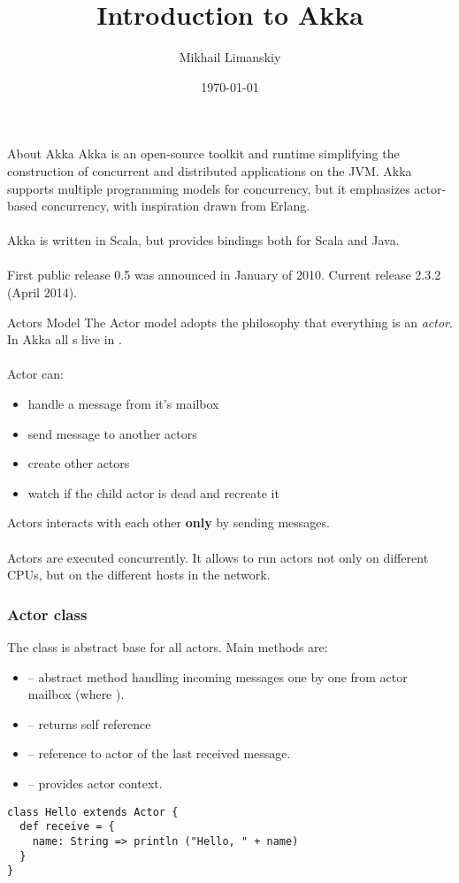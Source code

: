 \documentclass{beamer}
\title{Introduction to Akka}
\author{Mikhail Limanskiy}
\institute{SymphonyTeleca}
\date{\today}
\newcommand\strong\textbf
\begin{document}
\begin{frame}
    \titlepage
\end{frame}

\begin{frame}{About Akka}
Akka is an open-source toolkit and runtime simplifying the construction of concurrent
and distributed applications on the JVM. Akka supports multiple programming models
for concurrency, but it emphasizes actor-based concurrency, with inspiration drawn from Erlang.\\~\\

Akka is written in Scala, but provides bindings both for Scala and Java.\\~\\

First public release 0.5 was announced in January of 2010. Current release 2.3.2 (April 2014).
\end{frame}

\begin{frame}{Actors Model}
The Actor model adopts the philosophy that everything is an \emph{actor}.  In Akka all s
live in .\\~\\

Actor can:
\begin{itemize}
\item handle a message from it's mailbox
\item send message to another actors
\item create other actors
\item watch if the child actor is dead and recreate it
\end{itemize}
Actors interacts with each other \strong{only} by sending messages.\\~\\

Actors are executed concurrently.  It allows to run actors not only on different CPUs, but on the
different hosts in the network.
\end{frame}

\begin{frame}[fragile]
\frametitle{Actor class}
The  class is abstract base for all actors. Main methods are:
\begin{itemize}
  \item {} -- abstract method handling incoming messages one by one
    from actor mailbox
    (where ).
  \item {} -- returns self reference
  \item {} -- reference to actor of the last received message.
  \item {} -- provides actor context.
\end{itemize}
\begin{lstlisting}
class Hello extends Actor {
  def receive = {
    name: String => println ("Hello, " + name)
  }
}
\end{lstlisting}
\end{frame}
\end{document}
